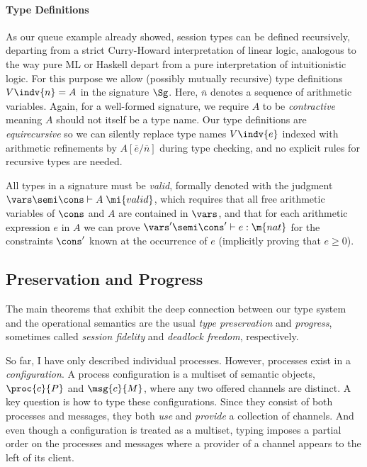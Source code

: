 \paragraph{\textbf{Type Definitions}}
As our queue example already showed, session types can be defined
recursively, departing from a strict Curry-Howard interpretation of
linear logic, analogous to the way pure ML or Haskell depart from
a pure interpretation of intuitionistic logic.  For this purpose we
allow (possibly mutually recursive) type definitions $V \indv{n} = A$
in the signature $\Sg$. Here, $\overline{n}$ denotes a sequence of
arithmetic variables. Again, for a well-formed signature, we require $A$ to be
\emph{contractive}~\cite{Gay2005} meaning $A$ should not itself be a
type name. Our type definitions are \emph{equirecursive} so we can
silently replace type names $V \indv{e}$ indexed with arithmetic
refinements by $A [\overline{e}/\overline{n}]$ during type checking,
and no explicit rules for recursive types are needed.

All types in a signature must be \emph{valid}, formally denoted with the judgment
$\vars \semi \cons \vdash A\; \mi{valid}$, which requires that all
free arithmetic variables of $\cons$ and $A$ are contained in $\vars$,
and that for each arithmetic expression $e$ in $A$ we can prove
$\vars' \semi \cons' \vdash e : \m{nat}$ for the constraints $\cons'$
known at the occurrence of $e$ (implicitly proving that $e \geq 0$).


\subsection{Preservation and Progress}
The main theorems that exhibit the deep connection between our type
system and the operational semantics are the usual \emph{type
  preservation} and \emph{progress}, sometimes called \emph{session
  fidelity} and \emph{deadlock freedom}, respectively.

So far, I have only described individual processes. However, processes
exist in a \emph{configuration}. A process configuration is a multiset
of semantic objects, $\proc{c}{P}$ and $\msg{c}{M}$, where any
two offered channels are distinct. A key question is how to type these
configurations. Since they consist of both processes and messages, they
both \emph{use} and \emph{provide} a collection of channels.
And even though a configuration is treated as a multiset, typing imposes
a partial order on the processes and messages where a provider of a
channel appears to the left of its client.


